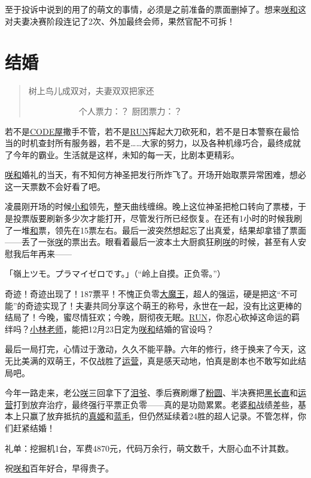 至于投诉中说到的用了的萌文的事情，必须是之前准备的票面删掉了。想来\uline{咲}\uline{和}这对夫妻决赛阶段连记了2次、外加最终会师，果然官配不可拆！

\chapter{结婚}
\begin{quote}
树上鸟儿成双对，夫妻双双把家还

　　　　　　个人票力：？ 厨团票力：？
\end{quote}

若不是\uline{CODE屋}撒手不管，若不是\uline{RUN}挥起大刀砍死和，若不是日本警察在最恰当的时机查封所有服务器，若不是……大家的努力，以及各种机缘巧合，最终成就了今年的霸业。生活就是这样，未知的每一天，比剧本更精彩。

\uline{咲}\uline{和}婚礼的当天，有不知何方神圣把发行所炸飞了。开场开始取票异常困难，想必这一天票数不会好看了吧。

凌晨刚开场的时候\uline{小和}领先，整天曲线缠绵。晚上这位神圣把枪口转向了票楼，于是投票版要刷新多少次才能打开，尽管发行所已经恢复。在还有1小时的时候我刷了一堆\uline{和}票，领先在15票左右。最后一波突然想起忘了出真爱，结果却拿错了票面——丢了一张\uline{咲}的票出去。眼看着最后一波本土大厨疯狂刷\uline{咲}的时候，甚至有人安慰我后年再来——

「嶺上ツモ。プラマイゼロです。」（“岭上自摸。正负零。”）

奇迹！奇迹出现了！187票平！不愧正负零\uline{大魔王}，超人的强运，硬是把这“不可能”的奇迹实现了！夫妻共同分享这个萌王的称号，永世在一起，没有比这更棒的结局了！今晚，蜜尽情狂欢；今晚，厨彻夜无眠。\uline{RUN}，你忍心砍掉这命运的羁绊吗？\uline{小林老师}，能把12月23日定为\uline{咲}\uline{和}结婚的官设吗？

最后一局打完，心情过于激动，久久不能平静。六年的修行，终于换来了今天，这无比美满的双萌王，不仅战胜了\uline{运营}，真是感天动地，怕真是剧本也不敢写如此结局吧。

今年一路走来，老公\uline{咲}三回拿下了\uline{泪爷}、季后赛刷爆了\uline{粉圆}、半决赛把\uline{黑长直}和\uline{运营}打到放弃治疗，最终强行平票正负零——真的是功勋累累。老婆\uline{和}战绩差些，基本上只赢了放弃抵抗的\uline{真姬}和\uline{蓝毛}，但仍然延续着24胜的超人记录。不管怎样，你们赶紧结婚！

礼单：挖掘机1台，军费4870元，代码万余行，萌文数千，大厨心血不计其数。

祝\uline{咲}\uline{和}百年好合，早得贵子。


